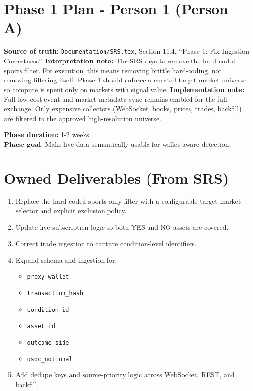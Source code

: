 \documentclass{article}
\begin{document}
\section*{Phase 1 Plan - Person 1 (Person A)}

\textbf{Source of truth:} \texttt{Documentation/SRS.tex}, Section 11.4, ``Phase 1: Fix Ingestion Correctness''.
\textbf{Interpretation note:} The SRS says to remove the hard-coded sports filter. For execution, this means removing brittle hard-coding, not removing filtering itself. Phase 1 should enforce a curated target-market universe so compute is spent only on markets with signal value.
\textbf{Implementation note:} Full low-cost event and market metadata sync remains enabled for the full exchange. Only expensive collectors (WebSocket, books, prices, trades, backfill) are filtered to the approved high-resolution universe.

\textbf{Phase duration:} 1-2 weeks\\
\textbf{Phase goal:} Make live data semantically usable for wallet-aware detection.

\section*{Owned Deliverables (From SRS)}
\begin{enumerate}
\item Replace the hard-coded sports-only filter with a configurable target-market selector and explicit exclusion policy.
\item Update live subscription logic so both YES and NO assets are covered.
\item Correct trade ingestion to capture condition-level identifiers.
\item Expand schema and ingestion for:
\begin{itemize}
\item \texttt{proxy\_wallet}
\item \texttt{transaction\_hash}
\item \texttt{condition\_id}
\item \texttt{asset\_id}
\item \texttt{outcome\_side}
\item \texttt{usdc\_notional}
\end{itemize}
\item Add dedupe keys and source-priority logic across WebSocket, REST, and backfill.
\end{enumerate}
\end{document}
